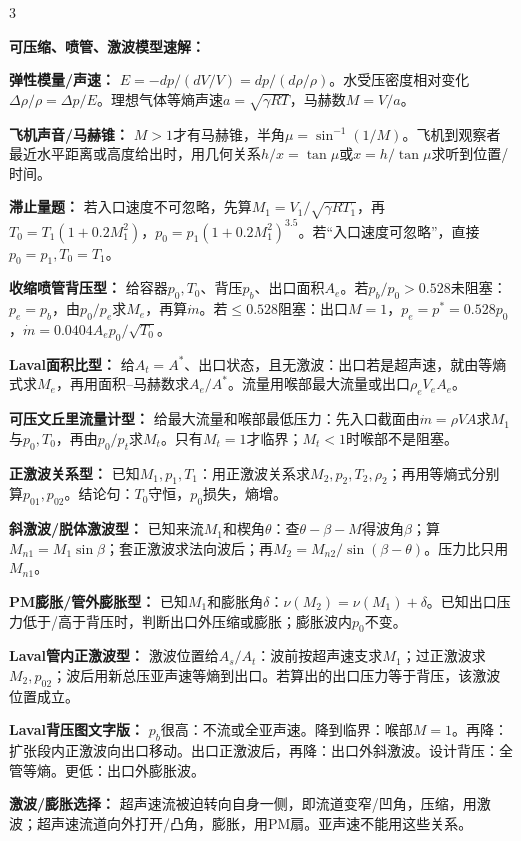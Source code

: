 \documentclass[a4paper]{article}
\newcommand{\sect}[1]{\par{\bfseries\color{Q}#1：}}
\begin{document}
\begin{multicols}{3}
{\sect{可压缩、喷管、激波模型速解}
\sect{弹性模量/声速}
$E=-dp/(dV/V)=dp/(d\rho/\rho)$。水受压密度相对变化$\Delta\rho/\rho=\Delta p/E$。理想气体等熵声速$a=\sqrt{\gamma RT}$，马赫数$M=V/a$。
\sect{飞机声音/马赫锥}
$M>1$才有马赫锥，半角$\mu=\sin^{-1}(1/M)$。飞机到观察者最近水平距离或高度给出时，用几何关系$h/x=\tan\mu$或$x=h/\tan\mu$求听到位置/时间。
\sect{滞止量题}
若入口速度不可忽略，先算$M_1=V_1/\sqrt{\gamma RT_1}$，再$T_0=T_1(1+0.2M_1^2)$，$p_0=p_1(1+0.2M_1^2)^{3.5}$。若“入口速度可忽略”，直接$p_0=p_1,T_0=T_1$。
\sect{收缩喷管背压型}
给容器$p_0,T_0$、背压$p_b$、出口面积$A_e$。若$p_b/p_0>0.528$未阻塞：$p_e=p_b$，由$p_0/p_e$求$M_e$，再算$\dot m$。若$\le0.528$阻塞：出口$M=1$，$p_e=p^*=0.528p_0$，$\dot m=0.0404A_ep_0/\sqrt{T_0}$。
\sect{Laval面积比型}
给$A_t=A^*$、出口状态，且无激波：出口若是超声速，就由等熵式求$M_e$，再用面积--马赫数求$A_e/A^*$。流量用喉部最大流量或出口$\rho_eV_eA_e$。
\sect{可压文丘里流量计型}
给最大流量和喉部最低压力：先入口截面由$\dot m=\rho VA$求$M_1$与$p_0,T_0$，再由$p_0/p_t$求$M_t$。只有$M_t=1$才临界；$M_t<1$时喉部不是阻塞。
\sect{正激波关系型}
已知$M_1,p_1,T_1$：用正激波关系求$M_2,p_2,T_2,\rho_2$；再用等熵式分别算$p_{01},p_{02}$。结论句：$T_0$守恒，$p_0$损失，熵增。
\sect{斜激波/脱体激波型}
已知来流$M_1$和楔角$\theta$：查$\theta-\beta-M$得波角$\beta$；算$M_{n1}=M_1\sin\beta$；套正激波求法向波后；再$M_2=M_{n2}/\sin(\beta-\theta)$。压力比只用$M_{n1}$。
\sect{PM膨胀/管外膨胀型}
已知$M_1$和膨胀角$\delta$：$\nu(M_2)=\nu(M_1)+\delta$。已知出口压力低于/高于背压时，判断出口外压缩或膨胀；膨胀波内$p_0$不变。
\sect{Laval管内正激波型}
激波位置给$A_s/A_t$：波前按超声速支求$M_1$；过正激波求$M_2,p_{02}$；波后用新总压亚声速等熵到出口。若算出的出口压力等于背压，该激波位置成立。
\sect{Laval背压图文字版}
$p_b$很高：不流或全亚声速。降到临界：喉部$M=1$。再降：扩张段内正激波向出口移动。出口正激波后，再降：出口外斜激波。设计背压：全管等熵。更低：出口外膨胀波。
\sect{激波/膨胀选择}
超声速流被迫转向自身一侧，即流道变窄/凹角，压缩，用激波；超声速流道向外打开/凸角，膨胀，用PM扇。亚声速不能用这些关系。

}
\end{multicols}
\end{document}
